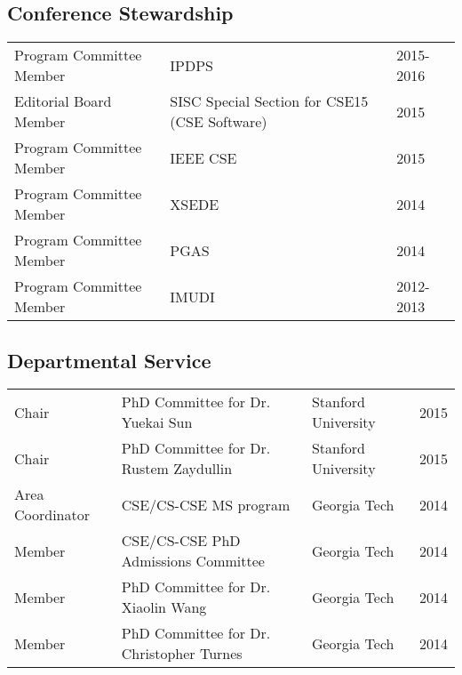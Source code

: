 \documentclass[letterpaper]{article}
\renewenvironment{itemize}{
  \begin{list}{}{
    \setlength{\leftmargin}{1.5em}
  }
}{
  \end{list}
}
\begin{document}
\subsection*{Conference Stewardship}
\begin{tabular}{lll}
Program Committee Member & IPDPS & 2015-2016 \\
Editorial Board Member & SISC Special Section for CSE15 (CSE Software) & 2015 \\
Program Committee Member & IEEE CSE & 2015 \\
Program Committee Member & XSEDE & 2014 \\
Program Committee Member & PGAS & 2014 \\
Program Committee Member & IMUDI & 2012-2013 \\
\end{tabular}

\subsection*{Departmental Service}
\begin{tabular}{llll}
Chair            & PhD Committee for Dr. Yuekai Sun & Stanford University & 2015 \\
Chair            & PhD Committee for Dr. Rustem Zaydullin & Stanford University & 2015 \\
Area Coordinator & CSE/CS-CSE MS program & Georgia Tech & 2014 \\
Member           & CSE/CS-CSE PhD Admissions Committee  & Georgia Tech & 2014 \\
Member           & PhD Committee for Dr. Xiaolin Wang   & Georgia Tech & 2014 \\
Member           & PhD Committee for Dr. Christopher Turnes & Georgia Tech & 2014 
\end{tabular}
\end{document}
